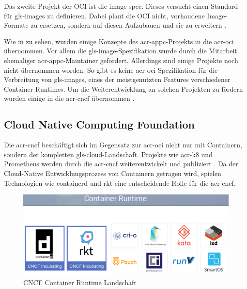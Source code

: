 Das zweite Projekt der OCI ist die image-spec. Dieses versucht einen Standard für \glspl{gls-image} zu definieren. Dabei plant die OCI nicht, vorhandene Image-Formate zu ersetzen, sondern auf diesen Aufzubauen und sie zu erweitern \citep{OpenContainerInitiative}.

Wie in  zu sehen, wurden einige Konzepte des \gls{acr-appc}-Projekts in die \gls{acr-oci} übernommen. Vor allem die \gls{gls-image}-Spezifikation wurde durch die Mitarbeit ehemaliger \gls{acr-appc}-Maintainer gefördert. Allerdings sind einige Projekte noch nicht übernommen worden. So gibt es keine \gls{acr-oci} Spezifikation für die Verbreitung von \glspl{gls-image}, eines der meistgenutzten Features verschiedener Container-Runtimes. Um die Weiterentwicklung an solchen Projekten zu fördern wurden einige in die \gls{acr-cncf} übernommen \citep{MakingSenseofContainerStandardsandFoundations:OCICNCFAppcandRkt}.

\subsection{Cloud Native Computing Foundation}
\label{sec:cncf}
Die \gls{acr-cncf} beschäftigt sich im Gegensatz zur \gls{acr-oci} nicht nur mit Containern, sondern der kompletten \gls{gls-cloud}-Landschaft. Projekte wie \gls{acr-k8} und Prometheus werden durch die \gls{acr-cncf} weiterentwickelt und publiziert \cite{}. Da der Cloud-Native Entwicklungsprozess von Containern getragen wird, spielen Technologien wie containerd und rkt eine entscheidende Rolle für die \gls{acr-cncf}.

\begin{figure}[h]
	\begin{center}
		\includegraphics[scale=0.3]{bilder/cncf-container-landscape.png}
		\caption{CNCF Container Runtime Landschaft \citep{CNCFCloudNativeInteractiveLandscape}}
		\label{fig:cncfContainerLandscape}
	\end{center}
\end{figure}

